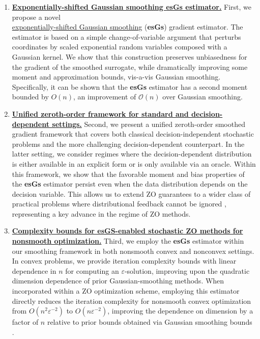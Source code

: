 \documentclass[11pt,reqno]{amsart}
\newcommand{\1}{{\bf 1}}
\newcommand{\2}{{\bf 2}}
\numberwithin{equation}{section}
\theoremstyle{remark}
\begin{document}
\begin{enumerate}[label =\textbf{\Roman*.}, wide, labelwidth=!, labelindent=0pt]
	
		\item {\bf  \ul{Exponentially-shifted Gaussian smoothing  {\bf esGs} estimator.}} First, we propose a novel \\ \ul{exponentially-shifted Gaussian smoothing} (\textbf{esGs}) gradient estimator. The estimator is based on a simple change-of-variable argument that perturbs coordinates by scaled exponential random variables composed with a Gaussian kernel. We show that this construction preserves unbiasedness for the gradient of the smoothed surrogate, while dramatically improving {some moment and approximation bounds, vis-a-vis Gaussian smoothing}. {Specifically, it can be shown that  the \textbf{esGs} estimator has a second moment bounded by $O(n)$, an improvement of $\mathcal{O}(n)$ over Gaussian smoothing.} 
		\medskip
		\item {\bf  \ul{Unified zeroth-order framework for standard and decision-dependent settings.}} Second, we present a unified {zeroth-order smoothed gradient} framework that covers both classical decision-independent stochastic problems and the more challenging decision-dependent  counterpart. {In the latter setting, we consider regimes where the decision-dependent distribution is either available in an explicit form or is only available via an oracle.} Within this framework, we show that the favorable moment and bias properties of the \textbf{esGs} estimator persist even when the data distribution depends on the decision variable. This allows us to extend ZO guarantees to a wider class of practical problems where distributional feedback cannot be ignored \cite{perdomo2020performative,drusvyatskiy2023stochastic}, representing a key advance in the regime of ZO methods.
		\medskip
		\item {\bf \ul{Complexity bounds for esGS-enabled stochastic ZO methods for nonsmooth optimization.}} Third, we {employ} the \textbf{esGs} estimator {within our smoothing framework in both nonsmooth convex and nonconvex settings}. {In} convex problems, we provide iteration  complexity bounds with linear dependence in $n$ for computing an $\varepsilon$-solution, improving upon the quadratic dimension dependence of prior Gaussian-smoothing methods. When incorporated within a ZO optimization scheme, employing this estimator directly reduces the iteration complexity for nonsmooth convex optimization from $O(n^2 \varepsilon^{-2})$ to $O(n \varepsilon^{-2})$, improving the dependence on dimension by a factor of $n$ relative to prior bounds obtained via Gaussian smoothing bounds \cite{nesterov2017random}.

\end{enumerate}
\end{document}
